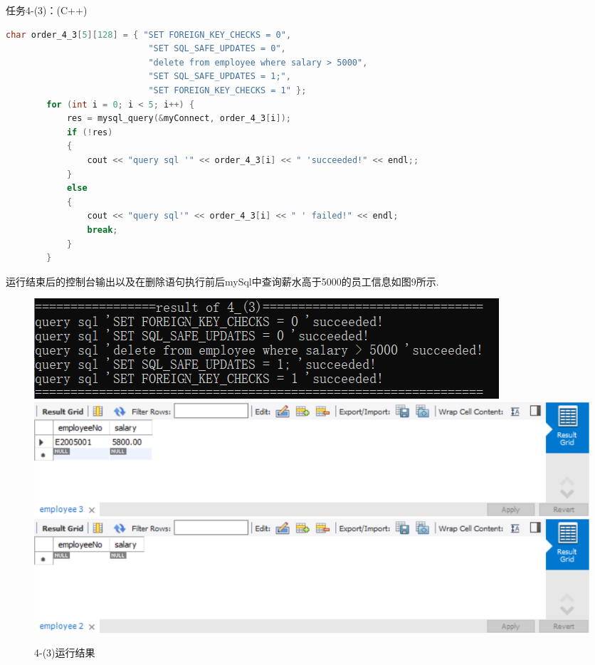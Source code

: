 \documentclass[a4paper,UTF8]{article}
\theoremstyle{definition}
\begin{document}
\begin{CJK}{UTF8}{gkai}
{\heiti \large 任务4-(3)：(C++)}
\begin{lstlisting}[language=C++]
char order_4_3[5][128] = { "SET FOREIGN_KEY_CHECKS = 0",
                            "SET SQL_SAFE_UPDATES = 0",
                            "delete from employee where salary > 5000",
                            "SET SQL_SAFE_UPDATES = 1;",
                            "SET FOREIGN_KEY_CHECKS = 1" };
        for (int i = 0; i < 5; i++) {
            res = mysql_query(&myConnect, order_4_3[i]);
            if (!res)
            {
                cout << "query sql '" << order_4_3[i] << " 'succeeded!" << endl;;
            }
            else
            {
                cout << "query sql'" << order_4_3[i] << " ' failed!" << endl;
                break;
            }
        }
\end{lstlisting}
\par 运行结束后的控制台输出以及在删除语句执行前后mySql中查询薪水高于5000的员工信息如图9所示.
\begin{figure}[h]
\centering
\includegraphics[scale=0.7]{./img/4-3-1.png}
\includegraphics[scale=0.6]{./img/4-3-2.png}
\includegraphics[scale=0.6]{./img/4-3-3.png}
\caption{4-(3)运行结果}
\label{fig:label}
\end{figure}


\end{CJK}
\end{document}
